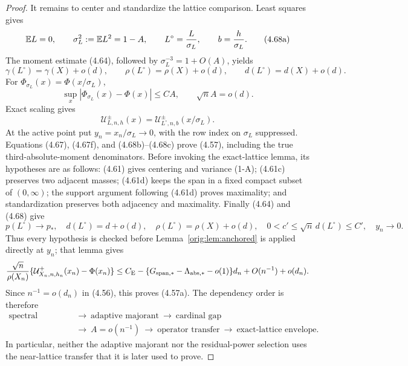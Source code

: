 \documentclass[11pt,a4paper]{article}
\numberwithin{equation}{section}
\theoremstyle{definition}
\theoremstyle{remark}
\newcommand{\E}{\mathbb E}
\newcommand{\CE}{C_{\mathrm E}}
\begin{document}
\begin{proof}
It remains to center and standardize the lattice comparison.  Least
squares gives
\[
 \E L=0,\qquad\sigma_L^2:=\E L^2=1-A,\qquad
 L^\circ={L\over\sigma_L},\qquad b={h\over\sigma_L}.   \tag{4.68a}
\]
The moment estimate (4.64), followed by
\(\sigma_L^{-3}=1+O(A)\), yields
\[
 \gamma(L^\circ)=\gamma(X)+o(d),\qquad
 \rho(L^\circ)=\rho(X)+o(d),\qquad
 d(L^\circ)=d(X)+o(d).                                \tag{4.68}
\]
For \(\Phi_{\sigma_L}(x)=\Phi(x/\sigma_L)\),
\[
 \sup_x|\Phi_{\sigma_L}(x)-\Phi(x)|\le CA,\qquad
 \sqrt nA=o(d).                                       \tag{4.68b}
\]
Exact scaling gives
\[
 \mathcal U^\pm_{L,n,h}(x)=
 \mathcal U^\pm_{L^\circ,n,b}(x/\sigma_L).            \tag{4.68c}
\]
At the active point put \(y_n=x_n/\sigma_L\to0\), with the row index on
\(\sigma_L\) suppressed.  Equations
(4.67), (4.67f), and (4.68b)--(4.68c) prove (4.57), including the true
third-absolute-moment denominators.  Before invoking the exact-lattice
lemma, its hypotheses are as follows: (4.61) gives centering and variance
(1-A); (4.61c) preserves two adjacent masses; (4.61d) keeps the span in
a fixed compact subset of $(0,\infty)$; the support argument following
(4.61d) proves maximality; and standardization preserves both adjacency
and maximality.  Finally (4.64) and (4.68) give
\[
 p(L^\circ)\to p_*,\quad d(L^\circ)=d+o(d),\quad
 \rho(L^\circ)=\rho(X)+o(d),\quad
 0<c'\le\sqrt n\,d(L^\circ)\le C',\quad y_n\to0.        \tag{4.68d}
\]
Thus every hypothesis is checked before Lemma~\ref{orig:lem:anchored} is applied
directly at \(y_n\); that lemma gives
\[
 {\sqrt n\over\rho(X_n)}
 \{\mathcal U^+_{X_n,n,h_n}(x_n)-\Phi(x_n)\}
 \le\CE-\{G_{\rm span,*}-\Lambda_{\rm abs,*}-o(1)\}d_n
       +O(n^{-1})+o(d_n).
\]
Since \(n^{-1}=o(d_n)\) in (4.56), this proves (4.57a).
The dependency order is therefore
\[
\begin{aligned}
 \text{spectral selection}&\ \longrightarrow\
 \text{adaptive majorant}\ \longrightarrow\
 \text{cardinal gap}\\
 &\ \longrightarrow\ A=o(n^{-1})\ \longrightarrow\
 \text{operator transfer}\ \longrightarrow\
 \text{exact-lattice envelope}.
\end{aligned}
\]
In particular, neither the adaptive majorant nor the residual-power
selection uses the near-lattice transfer that it is later used to prove.
\end{proof}
\end{document}
